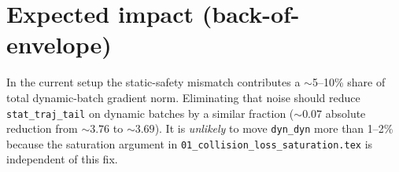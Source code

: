 \documentclass[11pt]{article}
\begin{document}
\section{Expected impact (back-of-envelope)}

In the current setup the static-safety mismatch contributes a $\sim$5--10\%
share of total dynamic-batch gradient norm. Eliminating that noise should
reduce \texttt{stat\_traj\_tail} on dynamic batches by a similar fraction
($\sim$$0.07$ absolute reduction from $\sim$$3.76$ to $\sim$$3.69$). It is
\emph{unlikely} to move \texttt{dyn\_dyn} more than 1--2\% because the
saturation argument in \texttt{01\_collision\_loss\_saturation.tex} is
independent of this fix.
\end{document}
